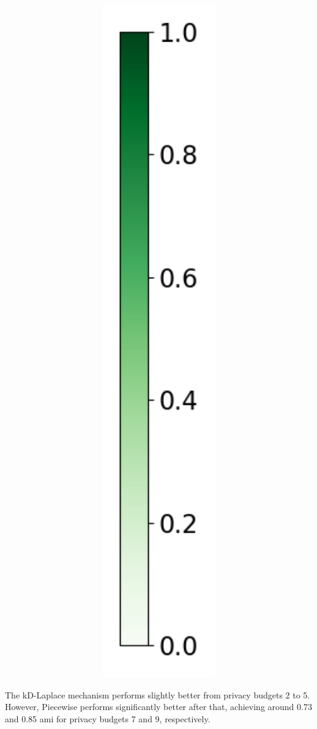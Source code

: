 \begin{figure}[H]
\begin{subfigure}[b]{0.075\textwidth}
    \includegraphics[width=1\textwidth]{Results/kd-laplace/kd-Laplace/skewed-dataset/heatmap_legend_ami.png}
  \end{subfigure}
\end{figure}
The kD-Laplace mechanism performs slightly better from privacy budgets 2 to 5. However, Piecewise performs significantly better after that, achieving around 0.73 and 0.85 \gls{ami} for privacy budgets 7 and 9, respectively.

